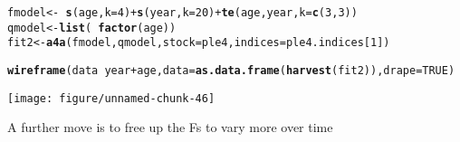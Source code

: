 \documentclass[a4paper,english,10pt]{article}\usepackage[]{graphicx}\usepackage[]{color}
\makeatletter
\def\maxwidth{ %
  \ifdim\Gin@nat@width>\linewidth
    \linewidth
  \else
    \Gin@nat@width
  \fi
}
\newcommand{\hlnum}[1]{\textcolor[rgb]{0.686,0.059,0.569}{#1}}%
\newcommand{\hlopt}[1]{\textcolor[rgb]{0,0,0}{#1}}%
\newcommand{\hlstd}[1]{\textcolor[rgb]{0.345,0.345,0.345}{#1}}%
\newcommand{\hlkwb}[1]{\textcolor[rgb]{0.69,0.353,0.396}{#1}}%
\newcommand{\hlkwc}[1]{\textcolor[rgb]{0.333,0.667,0.333}{#1}}%
\newcommand{\hlkwd}[1]{\textcolor[rgb]{0.737,0.353,0.396}{\textbf{#1}}}%
\newenvironment{kframe}{%
 \def\at@end@of@kframe{}%
 \ifinner\ifhmode%
  \def\at@end@of@kframe{\end{minipage}}%
  \begin{minipage}{\columnwidth}%
 \fi\fi%
 \def\FrameCommand##1{\hskip\@totalleftmargin \hskip-\fboxsep
 \colorbox{shadecolor}{##1}\hskip-\fboxsep
     \hskip-\linewidth \hskip-\@totalleftmargin \hskip\columnwidth}%
 \MakeFramed {\advance\hsize-\width
   \@totalleftmargin\z@ \linewidth\hsize
   \@setminipage}}%
 {\par\unskip\endMakeFramed%
 \at@end@of@kframe}
\newenvironment{knitrout}{}{} %
\makeatother
\begin{document}
\begin{knitrout}
\color{fgcolor}\begin{kframe}
\begin{alltt}
\hlstd{fmodel} \hlkwb{<-} \hlopt{~}\hlkwd{s}\hlstd{(age,} \hlkwc{k} \hlstd{=} \hlnum{4}\hlstd{)} \hlopt{+} \hlkwd{s}\hlstd{(year,} \hlkwc{k} \hlstd{=} \hlnum{20}\hlstd{)} \hlopt{+} \hlkwd{te}\hlstd{(age, year,} \hlkwc{k} \hlstd{=} \hlkwd{c}\hlstd{(}\hlnum{3}\hlstd{,} \hlnum{3}\hlstd{))}
\hlstd{qmodel} \hlkwb{<-} \hlkwd{list}\hlstd{(}\hlopt{~}\hlkwd{factor}\hlstd{(age))}
\hlstd{fit2} \hlkwb{<-} \hlkwd{a4a}\hlstd{(fmodel, qmodel,} \hlkwc{stock} \hlstd{= ple4,} \hlkwc{indices} \hlstd{= ple4.indices[}\hlnum{1}\hlstd{])}
\end{alltt}


{\ttfamily\noindent\itshape\color{messagecolor}{\#\# Note: The following observations are treated as being missing at random:\\\#\# 	\ \ \ \ fleet year age\\\#\# 	 BTS-Isis 1997\ \  1\\\#\# 	 BTS-Isis 1997\ \  2\\\#\#\ \ \ \ \ \  Predictions will be made for missing observations.}}\begin{alltt}
\hlkwd{wireframe}\hlstd{(data} \hlopt{~} \hlstd{year} \hlopt{+} \hlstd{age,} \hlkwc{data} \hlstd{=} \hlkwd{as.data.frame}\hlstd{(}\hlkwd{harvest}\hlstd{(fit2)),} \hlkwc{drape} \hlstd{=} \hlnum{TRUE}\hlstd{)}
\end{alltt}
\end{kframe}
\texttt{[image: figure/unnamed-chunk-46]} 

\end{knitrout}


A further move is to free up the Fs to vary more over time
\end{document}
